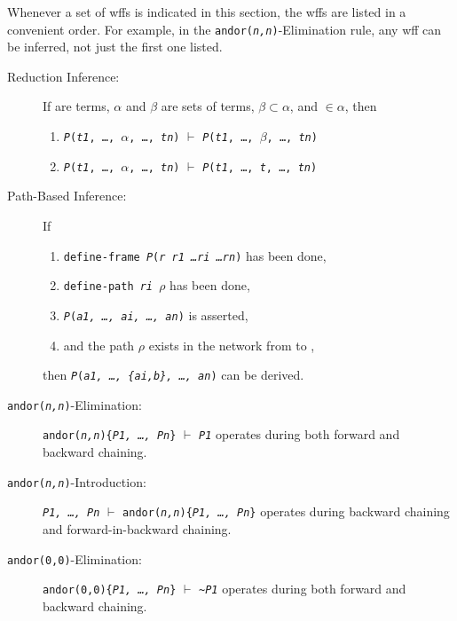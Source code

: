\documentclass{book}
\newcommand{\cv}[1]{{\ttfamily{\itshape #1}}} %
\begin{document}
Whenever a set of wffs is indicated in this section, the wffs are
listed in a convenient order.  For example, in the
\texttt{andor(\textit{n,n})}-Elimination rule, any wff can be
inferred, not just the first one listed.

\begin{description}
\item[Reduction Inference:] If \cv{t, t1, \ldots, tn} are terms,
  $\alpha$ and $\beta$ are sets of terms, $\beta \subset \alpha$, and
  \cv{t} $\in \alpha$, then
  \begin{enumerate}
  \item \texttt{\textit{P}(\textit{t1}, \ldots, $\alpha$, \ldots,
      \textit{tn})} $\vdash$ \texttt{\textit{P}(\textit{t1}, \ldots,
      $\beta$, \ldots, \textit{tn})}
  \item \texttt{\textit{P}(\textit{t1}, \ldots, $\alpha$, \ldots,
      \textit{tn})} $\vdash$ \texttt{\textit{P}(\textit{t1}, \ldots,
      \textit{t}, \ldots, \textit{tn})}
  \end{enumerate}

\item[Path-Based Inference:] If
  \begin{enumerate}
  \item \texttt{define-frame \textit{P}(\textit{r r1 \ldots ri \ldots rn})} has
    been done,
  \item \texttt{define-path \textit{ri} $\rho$} has been done,
  \item \texttt{\textit{P}(\textit{a1, \ldots, ai, \ldots, an})} is
    asserted,
  \item and the path $\rho$ exists in the network from \cv{ai} to \cv{b},
  \end{enumerate}
  then \texttt{\textit{P}(\textit{a1, \ldots, \{ai,b\}, \ldots, an})}
  can be derived.

\item[\texttt{andor(\textit{n,n})}-Elimination:]
\texttt{andor(\textit{n,n})\{\textit{P1, \ldots, Pn}\}} $\vdash$
\texttt{\textit{P1}} operates during both forward and
  backward chaining.

\item[\texttt{andor(\textit{n,n})}-Introduction:] \texttt{\textit{P1,
      \ldots, Pn}} $\vdash$ \texttt{andor(\textit{n,n})\{\textit{P1,
      \ldots, Pn}\}} operates during backward chaining and
forward-in-backward chaining.

\item[\texttt{andor(0,0)}-Elimination:]
  \texttt{andor(0,0)\{\textit{P1, \ldots, Pn}\}} $\vdash$
  \verb|~|\texttt{\textit{P1}} operates during both forward and
  backward chaining.
  

\end{description}
\end{document}
